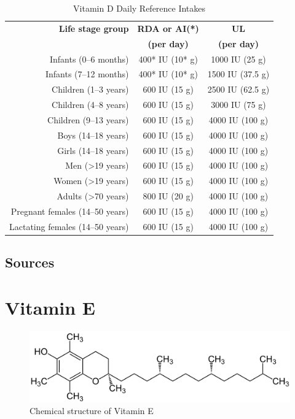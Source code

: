 \documentclass{book}
\begin{document}
\begin{sloppypar}
\begin{table}[ht]
	\caption{Vitamin D Daily Reference Intakes}
	\centering \begin{tabular}{| r | c | c |}
		\hline
		\textbf{Life stage group} & \textbf{RDA or AI(*)} & \textbf{UL}\\
		& \textbf{(per day)} & \textbf{(per day)}\\ \hline
		Infants (0--6 months) & 400* IU (10* \textmu g) & 1000 IU (25 \textmu g)\\ \hline
		Infants (7--12 months) & 400* IU (10* \textmu g) & 1500 IU (37.5 \textmu g)\\ \hline
		Children (1--3 years) & 600 IU (15 \textmu g) & 2500 IU (62.5 \textmu g)\\ \hline
		Children (4--8 years) & 600 IU (15 \textmu g) & 3000 IU (75 \textmu g)\\ \hline
		Children (9--13 years) & 600 IU (15 \textmu g) & 4000 IU (100 \textmu g)\\ \hline
		Boys (14--18 years) & 600 IU (15 \textmu g) & 4000 IU (100 \textmu g)\\ \hline
		Girls (14--18 years) & 600 IU (15 \textmu g) & 4000 IU (100 \textmu g)\\ \hline
		Men (\textgreater19 years) & 600 IU (15 \textmu g) & 4000 IU (100 \textmu g)\\ \hline
		Women (\textgreater19 years) & 600 IU (15 \textmu g) & 4000 IU (100 \textmu g)\\ \hline
		Adults (\textgreater70 years) & 800 IU (20 \textmu g) & 4000 IU (100 \textmu g)\\ \hline
		Pregnant females (14--50 years) & 600 IU (15 \textmu g) & 4000 IU (100 \textmu g)\\ \hline
		Lactating females (14--50 years) & 600 IU (15 \textmu g) & 4000 IU (100 \textmu g)\\ \hline
	\end{tabular}
\end{table}
\newpage


\section{Sources}


\chapter{Vitamin E}
\begin{figure}[h]
	\caption{Chemical structure of Vitamin E}
	\centering \includegraphics[width=\textwidth]{images/Vitamin_E_chemical_structure}
\end{figure}
\newpage


\end{sloppypar}
\end{document}
